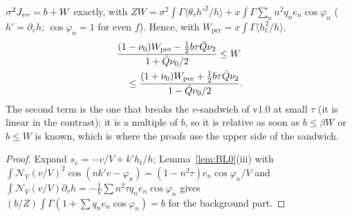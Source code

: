 \begin{lemma}[$v$-information] \proofst
\label{lem:BL2}
$\sigma^2J_{vv}=b+W$ exactly, with
$ZW=\sigma^2\int\Gamma\langle\theta_\tau h'^2/h\rangle+x\int\Gamma\sum_nn^2q_ne_n\cos\varphi_n$ ($h'=\partial_vh$; $\cos\varphi_n=1$ for even $f$). Hence, with $W_{\mathrm{per}}=x\int\Gamma\langle h_t^2/h\rangle$,
\begin{equation}
\begin{aligned}&\frac{(1-\nu_0)W_{\mathrm{per}}-\tfrac12b\tau\bar Q\nu_2}{1+\bar Q\nu_0/2}\le W\\&\quad\le\frac{(1+\nu_0)W_{\mathrm{per}}+\tfrac12b\tau\bar Q\nu_2}{1-\bar Q\nu_0/2}.\end{aligned}
\end{equation}
The second term is the one that breaks the $v$-sandwich of v1.0 at small $\tau$ (it is linear in the contrast); it is a multiple of $b$, so it is
relative as soon as $b\le\beta W$ or $b\le W$ is known, which is where the proofs use the upper side of the sandwich.
\end{lemma}
\begin{proof}
Expand $s_v=-v/V+k'h_t/h$; Lemma~\ref{lem:BL0}(iii) with $\int\mathcal N_V(v/V)^2\cos(nk'v-\varphi_n)=(1-n^2\tau)e_n\cos\varphi_n/V$ and
$\int\mathcal N_V(v/V)\partial_vh=-\tfrac1V\sum n^2\tau q_ne_n\cos\varphi_n$ gives $(b/Z)\int\Gamma(1+\sum q_ne_n\cos\varphi_n)=b$ for the background part.
\end{proof}

